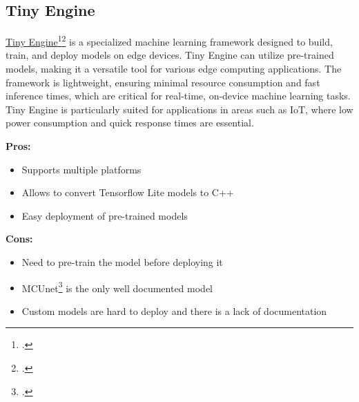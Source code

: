 \subsection{Tiny Engine}
\label{tiny-engine}
\href{https://github.com/mit-han-lab/tinyengine}{Tiny Engine}\footcite{site:tinyengine}\footcite{lin2022ondevice} is a specialized machine learning framework designed to build, train, and deploy models on edge devices. Tiny Engine can utilize pre-trained models, making it a versatile tool for various edge computing applications. The framework is lightweight, ensuring minimal resource consumption and fast inference times, which are critical for real-time, on-device machine learning tasks. Tiny Engine is particularly suited for applications in areas such as IoT, where low power consumption and quick response times are essential.

\textbf{Pros:}
\begin{itemize}
    \item Supports multiple platforms
    \item Allows to convert Tensorflow Lite models to C++
    \item Easy deployment of pre-trained models
\end{itemize}
\textbf{Cons:}
\begin{itemize}
    \item Need to pre-train the model before deploying it
    \item MCUnet\footcite[An algorithm for deep learning on microcontrollers]{lin2020mcunet} is the only well documented model
    \item Custom models are hard to deploy and there is a lack of documentation
\end{itemize}



